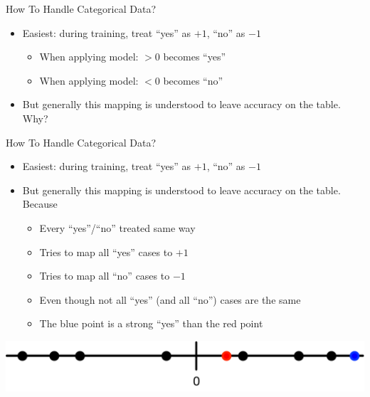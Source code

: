 \documentclass[aspectratio=169]{beamer}
\begin{document}
\begin{frame}{How To Handle Categorical Data?}
\begin{itemize}
\item Easiest: during training, treat ``yes'' as $+1$, ``no'' as $-1$
	\begin{itemize}
		\item When applying model: $> 0$ becomes ``yes''
		\item When applying model: $< 0$ becomes ``no''
	\end{itemize}
\item But generally this mapping is understood to leave accuracy on the table. Why?
\end{itemize}
\end{frame}
\begin{frame}{How To Handle Categorical Data?}
\begin{itemize}
\item Easiest: during training, treat ``yes'' as $+1$, ``no'' as $-1$
\item But generally this mapping is understood to leave accuracy on the table. Because 
	\begin{itemize}
	\item Every ``yes''/``no'' treated same way
	\item Tries to map all ``yes'' cases to $+1$
	\item Tries to map all ``no'' cases to $-1$
	\item Even though not all ``yes'' (and all ``no'') cases are the same
	\item The blue point is a strong ``yes'' than the red point
	\end{itemize}
\end{itemize}
\vspace{2em}
     \includegraphics[width=1\textwidth]{lectLR/yesNoCases.pdf} 
\end{frame}
\end{document}
